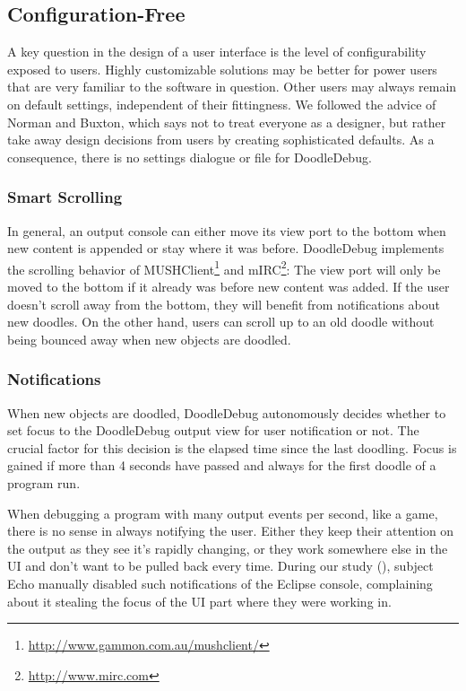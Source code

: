 \documentclass[english]{scrartcl}
\newcommand{\DD}{Dood\-le\-De\-bug\xspace}
\begin{document}
\subsection{Configuration-Free}
A key question in the design of a user interface is the level of configurability exposed to users.
Highly customizable solutions may be better for power users that are very familiar to the software in question.
Other users may always remain on default settings, independent of their fittingness.
We followed the advice of Norman\cite{?} and Buxton\cite{?}, which says not to treat everyone as a designer, but rather take away design decisions from users by creating sophisticated defaults.
As a consequence, there is no settings dialogue or file for \DD.

\subsubsection{Smart Scrolling}
In general, an output console can either move its view port to the bottom when new content is appended or stay where it was before.
\DD implements the scrolling behavior of MUSHClient\footnote{\url{http://www.gammon.com.au/mushclient/}} and mIRC\footnote{\url{http://www.mirc.com}}:
The view port will only be moved to the bottom if it already was before new content was added.
If the user doesn't scroll away from the bottom, they will benefit from notifications about new doodles.
On the other hand, users can scroll up to an old doodle without being bounced away when new objects are doodled.

\subsubsection{Notifications}
When new objects are doodled, \DD autonomously decides whether to set focus to the \DD output view for user notification or not.
The crucial factor for this decision is the elapsed time since the last doodling.
Focus is gained if more than 4 seconds have passed and always for the first doodle of a program run.

When debugging a program with many output events per second, like a game, there is no sense in always notifying the user.
Either they keep their attention on the output as they see it's rapidly changing, or they work somewhere else in the UI and don't want to be pulled back every time.
During our study (), subject Echo manually disabled such notifications of the Eclipse console, complaining about it stealing the focus of the UI part where they were working in.
\end{document}

